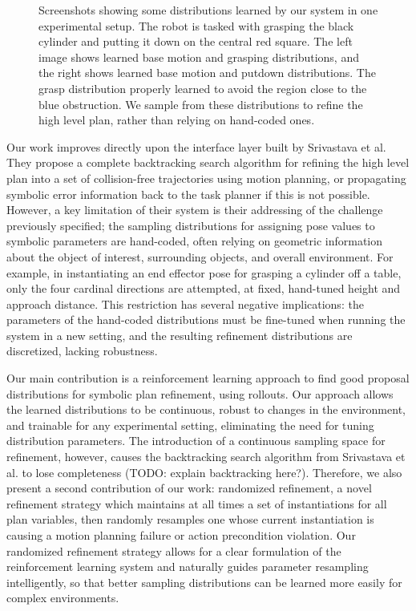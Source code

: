 \begin{figure}[h]
  \caption{Screenshots showing some distributions learned by our system in one experimental
    setup. The robot is tasked with grasping the black cylinder and putting it down on the
    central red square. The left image shows learned base motion and grasping distributions,
    and the right shows learned base motion and putdown distributions. The grasp distribution
    properly learned to avoid the region close to the blue obstruction. We sample from these distributions
    to refine the high level plan, rather than relying on hand-coded ones.}
  \label{fig:cover}
\end{figure}

Our work improves directly upon the interface layer built
by Srivastava et al. They propose a complete backtracking search algorithm for refining
the high level plan into a set of collision-free trajectories using motion planning, or
propagating symbolic error information back to the task planner if this is not possible.
However, a key limitation of their system is their addressing of the challenge
previously specified; the sampling distributions for
assigning pose values to symbolic parameters are hand-coded, often relying on
geometric information about the object of interest, surrounding objects, and overall
environment. For example, in instantiating an end effector pose for grasping a cylinder off a table,
only the four cardinal directions are attempted, at fixed, hand-tuned height and approach
distance. This restriction has several negative implications: the parameters of the
hand-coded distributions must be fine-tuned when running the system in a new setting, and the
resulting refinement distributions are discretized, lacking robustness.

Our main contribution is a reinforcement learning approach to find good proposal
distributions for symbolic plan refinement, using rollouts. Our approach allows
the learned distributions to be continuous, robust to changes in the environment, and
trainable for any experimental setting, eliminating the need for tuning distribution parameters. The
introduction of a continuous sampling space for refinement, however, causes the backtracking
search algorithm from Srivastava et al. to lose completeness (TODO: explain backtracking here?). Therefore, we also
present a second contribution of our work: randomized refinement, a novel refinement strategy
which maintains at all times a set of instantiations for all plan variables, then randomly
resamples one whose current instantiation is causing a motion planning failure or action precondition
violation. Our randomized refinement strategy allows for a clear formulation of the reinforcement
learning system and naturally guides parameter resampling intelligently, so that better
sampling distributions can be learned more easily for complex environments.

